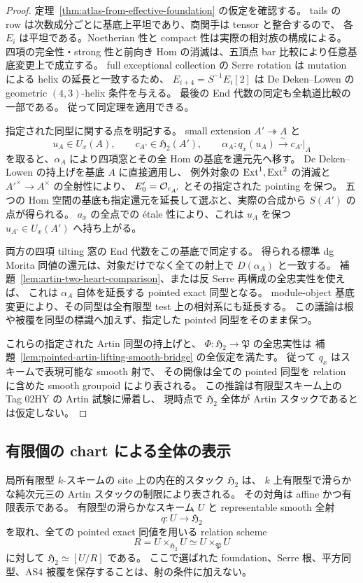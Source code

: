\begin{proof}
定理~\ref{thm:atlas-from-effective-foundation} の仮定を確認する。
tails の row は次数成分ごとに基底上平坦であり、商関手は tensor と整合するので、
各 $E_i$ は平坦である。Noetherian 性と compact 性は実際の相対族の構成による。
四項の完全性・strong 性と前向き Hom の消滅は、五頂点 bar 比較により任意基底変更上で成立する。
full exceptional collection の Serre rotation は mutation による helix の延長と一致するため、
$E_{i+4}=S^{-1}E_i[2]$ は De Deken--Lowen の geometric $(4,3)$-helix 条件を与える。
最後の End 代数の同定も全軌道比較の一部である。
従って同定理を適用できる。

指定された同型に関する点を明記する。
small extension $A'\twoheadrightarrow A$ と
\[
 u_A\in U_x(A),\qquad c_{A'}\in\mathfrak H_2(A'),\qquad
 \alpha_A:q_x(u_A)\xrightarrow{\sim}c_{A'}|_A
\]
を取ると、$\alpha_A$ により四項窓とその全 Hom の基底を還元先へ移す。
De Deken--Lowen の持上げを基底 $A$ に直接適用し、
例外対象の $\operatorname{Ext}^1,\operatorname{Ext}^2$ の消滅と $A'^\times\to A^\times$ の全射性により、
$E'_0=\mathcal O_{c_{A'}}$ とその指定された pointing を保つ。
五つの Hom 空間の基底も指定還元を延長して選ぶと、実際の合成から $S(A')$ の点が得られる。
$a_x$ の全点での étale 性により、これは $u_A$ を保つ $u_{A'}\in U_x(A')$ へ持ち上がる。

両方の四項 tilting 窓の End 代数をこの基底で同定する。
得られる標準 dg Morita 同値の還元は、対象だけでなく全ての射上で $D(\alpha_A)$ と一致する。
補題~\ref{lem:artin-two-heart-comparison}、または反 Serre 再構成の全忠実性を使えば、
これは $\alpha_A$ 自体を延長する pointed exact 同型となる。
module-object 基底変更により、その同型は全有限型 test 上の相対系にも延長する。
この議論は根や被覆を同型の標識へ加えず、指定した pointed 同型をそのまま保つ。

これらの指定された Artin 同型の持上げと、
$\Phi:\mathfrak H_2\to\mathfrak P$ の全忠実性は
補題~\ref{lem:pointed-artin-lifting-smooth-bridge} の全仮定を満たす。
従って $q_x$ はスキームで表現可能な smooth 射で、
その開像は全ての pointed 同型を relation に含めた
smooth groupoid により表される。
この推論は有限型スキーム上の Tag 02HY の Artin 試験に帰着し、
現時点で $\mathfrak H_2$ 全体が Artin スタックであるとは仮定しない。
\end{proof}

\subsection{有限個の chart による全体の表示}

\begin{theorem}
\label{thm:global-h2-smooth-finite-type}
局所有限型 $k$-スキームの site 上の内在的スタック $\mathfrak H_2$ は、
$k$ 上有限型で滑らかな純次元三の Artin スタックの制限により表される。
その対角は affine かつ有限表示である。
有限型の滑らかなスキーム $U$ と representable smooth 全射
\[
 q:U\longrightarrow\mathfrak H_2
\]
を取れ、全ての pointed exact 同値を用いる relation scheme
\[
 R=U\times_{\mathfrak H_2}U
   \simeq U\times_{\mathfrak P}U
\]
に対して $\mathfrak H_2\simeq[U/R]$ である。
ここで選ばれた foundation、Serre 根、平方同型、AS4 被覆を保存することは、射の条件に加えない。
\end{theorem}

